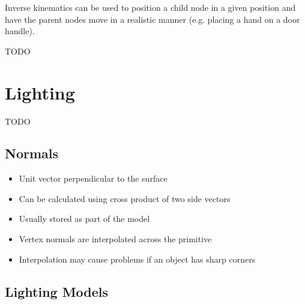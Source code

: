 \documentclass[a4paper]{article}
\begin{document}
Inverse kinematics can be used to position a child node in a given position and
have the parent nodes move in a realistic manner (e.g. placing a hand on a door
handle).

TODO

\section{Lighting}

TODO

\subsection{Normals}

\begin{itemize}
  \item
    Unit vector perpendicular to the surface

  \item
    Can be calculated using cross product of two side vectors

  \item
    Usually stored as part of the model

  \item
    Vertex normals are interpolated across the primitive

  \item
    Interpolation may cause problems if an object has sharp corners

\end{itemize}

\subsection{Lighting Models}
\end{document}

